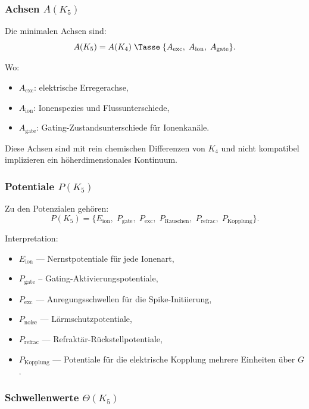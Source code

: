 \subsubsection{Achsen \texorpdfstring{$A(K_5)$}{A(K_5)}}

Die minimalen Achsen sind:
\[
A(K_5) = A(K_4)\; \Tasse\;
\{ A_{\mathrm{exc}},\; A_{\mathrm{ion}},\; A_{\mathrm{gate}} \}.
\]

Wo:
\begin{itemize}
    \item $A_{\mathrm{exc}}$: elektrische Erregerachse,
    \item $A_{\mathrm{ion}}$: Ionenspezies und Flussunterschiede,
    \item $A_{\mathrm{gate}}$: Gating-Zustandsunterschiede für Ionenkanäle.
\end{itemize}

Diese Achsen sind mit rein chemischen Differenzen von $K_4$ und nicht kompatibel
implizieren ein höherdimensionales Kontinuum.

\subsubsection{Potentiale \texorpdfstring{$P(K_5)$}{P(K_5)}}

Zu den Potenzialen gehören:
\[
P(K_5)=\{
E_{\mathrm{ion}},\;
P_{\mathrm{gate}},\;
P_{\mathrm{exc}},\;
P_{\mathrm{Rauschen}},\;
P_{\mathrm{refrac}},\;
P_{\mathrm{Kopplung}}
\}.
\]

Interpretation:
\begin{itemize}
    \item $E_{\mathrm{ion}}$ — Nernstpotentiale für jede Ionenart,
    \item $P_{\mathrm{gate}}$ – Gating-Aktivierungspotentiale,
    \item $P_{\mathrm{exc}}$ — Anregungsschwellen für die Spike-Initiierung,
    \item $P_{\mathrm{noise}}$ — Lärmschutzpotentiale,
    \item $P_{\mathrm{refrac}}$ — Refraktär-Rückstellpotentiale,
    \item $P_{\mathrm{Kopplung}}$ — Potentiale für die elektrische Kopplung
          mehrere Einheiten über $G$.
\end{itemize}

\subsubsection{Schwellenwerte \texorpdfstring{$\Theta(K_5)$}{\Theta(K_5)}}

